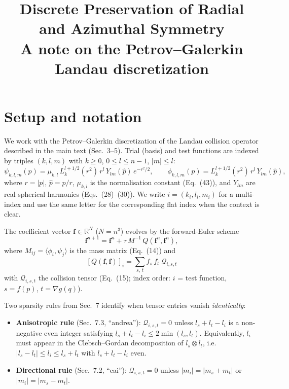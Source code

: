 \documentclass[11pt, a4paper]{article}
\title{Discrete Preservation of Radial and Azimuthal Symmetry\\[4pt]
       \large A note on the Petrov--Galerkin Landau discretization}
\author{}
\date{}
\begin{document}
\maketitle

\section*{Setup and notation}

We work with the Petrov--Galerkin discretization of the Landau collision
operator described in the main text (Sec.~3--5).  Trial (basis) and test
functions are indexed by triples $(k,l,m)$ with $k \geq 0$,
$0 \leq l \leq n-1$, $|m| \leq l$:
\[
  \psi_{k,l,m}(p)
    = \mu_{k,l}\, L_k^{l+1/2}(r^2)\, r^l\, Y_{lm}(\hat p)\, e^{-r^2/2},
  \qquad
  \phi_{k,l,m}(p)
    = L_k^{l+1/2}(r^2)\, r^l\, Y_{lm}(\hat p),
\]
where $r = |p|$, $\hat p = p/r$, $\mu_{k,l}$ is the normalisation constant
(Eq.~(43)), and $Y_{lm}$ are real spherical harmonics (Eqs.~(28)--(30)).
We write $i = (k_i, l_i, m_i)$ for a multi-index and use the same letter for
the corresponding flat index when the context is clear.

The coefficient vector $\mathbf{f} \in \mathbb{R}^N$ ($N = n^3$) evolves by
the forward-Euler scheme
\begin{equation}\label{eq:scheme}
  \mathbf{f}^{n+1} = \mathbf{f}^n
    + \tau\, M^{-1}\, Q(\mathbf{f}^n, \mathbf{f}^n),
\end{equation}
where $M_{ij} = \langle \phi_i, \psi_j \rangle$ is the mass matrix (Eq.~(14))
and
\begin{equation}\label{eq:Q}
  [Q(\mathbf{f}, \mathbf{f})]_i
    = \sum_{s,\, t} f_s\, f_t\; \mathcal{Q}_{i,s,t}
\end{equation}
with $\mathcal{Q}_{i,s,t}$ the collision tensor (Eq.~(15); index order:
$i$ = test function, $s = f(p)$, $t = \nabla g(q)$).

Two sparsity rules from Sec.~7 identify when tensor entries vanish
\emph{identically}:

\begin{itemize}
  \item \textbf{Anisotropic rule} (Sec.~7.3, ``andrea''):
    $\mathcal{Q}_{i,s,t} = 0$ unless $l_s + l_t - l_i$ is a non-negative
    even integer satisfying $l_s + l_t - l_i \leq 2\min(l_s, l_t)$.
    Equivalently, $l_i$ must appear in the Clebsch--Gordan decomposition of
    $l_s \otimes l_t$, i.e.\ $|l_s - l_t| \leq l_i \leq l_s + l_t$ with
    $l_s + l_t - l_i$ even.

  \item \textbf{Directional rule} (Sec.~7.2, ``cai''):
    $\mathcal{Q}_{i,s,t} = 0$ unless $|m_i| = |m_s + m_t|$ or
    $|m_i| = |m_s - m_t|$.
\end{itemize}
\end{document}
